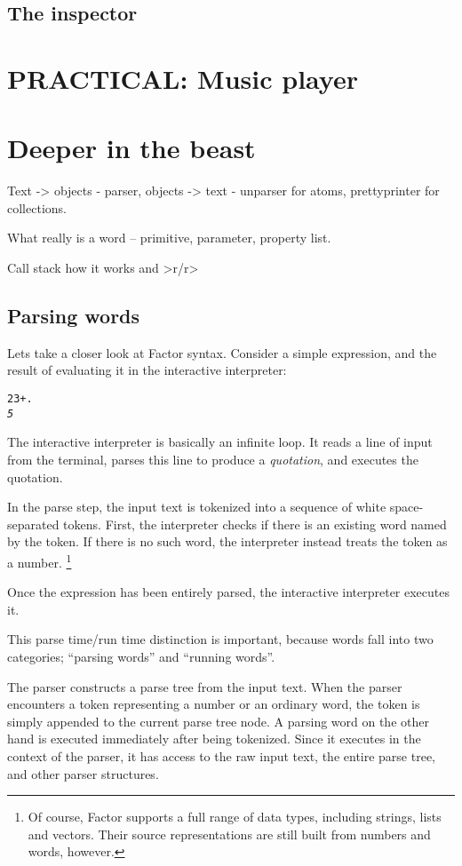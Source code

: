 \documentclass[english]{article}
\begin{document}
\subsection{The inspector}


\section{PRACTICAL: Music player}


\section{Deeper in the beast}

Text -> objects - parser, objects -> text - unparser for atoms, prettyprinter
for collections.

What really is a word -- primitive, parameter, property list.

Call stack how it works and >r/r>


\subsection{Parsing words}

Lets take a closer look at Factor syntax. Consider a simple expression,
and the result of evaluating it in the interactive interpreter:

\begin{alltt}
2 3 + .
\emph{5}
\end{alltt}
The interactive interpreter is basically an infinite loop. It reads
a line of input from the terminal, parses this line to produce a \emph{quotation},
and executes the quotation.

In the parse step, the input text is tokenized into a sequence of
white space-separated tokens. First, the interpreter checks if there
is an existing word named by the token. If there is no such word,
the interpreter instead treats the token as a number.%
\footnote{Of course, Factor supports a full range of data types, including strings,
lists and vectors. Their source representations are still built from
numbers and words, however.%
}

Once the expression has been entirely parsed, the interactive interpreter
executes it.

This parse time/run time distinction is important, because words fall
into two categories; {}``parsing words'' and {}``running words''.

The parser constructs a parse tree from the input text. When the parser
encounters a token representing a number or an ordinary word, the
token is simply appended to the current parse tree node. A parsing
word on the other hand is executed \emph{}immediately after being
tokenized. Since it executes in the context of the parser, it has
access to the raw input text, the entire parse tree, and other parser
structures.
\end{document}
